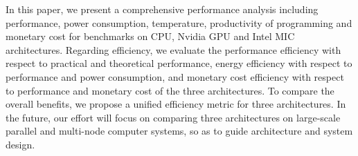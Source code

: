 \vspace{-1mm} 
In this paper, we present a comprehensive performance analysis including performance, power consumption, temperature, productivity of programming and monetary cost for benchmarks on CPU, Nvidia GPU and Intel MIC architectures. Regarding efficiency, we evaluate the performance efficiency with respect to practical and theoretical performance, energy efficiency with respect to performance and power consumption, and monetary cost efficiency with respect to performance and monetary cost of the three architectures. To compare the overall benefits, we propose a unified efficiency metric for three architectures. In the future, our effort will focus on comparing three architectures on large-scale parallel and multi-node computer systems, so as to guide architecture and system design.